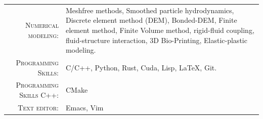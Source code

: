 %
%



\renewcommand{\arraystretch}{1.1}

    \begin{tabular}{>{}r>{}p{13cm}}
      \textsc{Numerical modeling:} & Meshfree methods, Smoothed particle hydrodynamics,
                                     Discrete element method (DEM), Bonded-DEM,
                                     Finite element method,
                                     Finite Volume method,
                                     rigid-fluid coupling,
                                     fluid-structure interaction,
                                     3D Bio-Printing,
                                     Elastic-plastic modeling.\\

      \textsc{Programming Skills:}    &  C/C++, Python, Rust, Cuda, Lisp, \LaTeX, Git.\\

      \textsc{Programming Skills C++:}  &  CMake\\

      \textsc{Text editor:}    &  Emacs, Vim
    \end{tabular}
